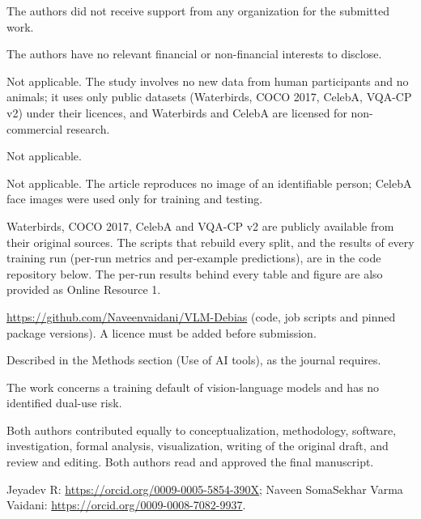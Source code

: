\documentclass[pdflatex,sn-basic,iicol]{sn-jnl}
\theoremstyle{thmstyleone}
\theoremstyle{thmstyletwo}
\theoremstyle{thmstylethree}
\begin{document}
The authors did not receive support from any organization for the submitted work.

The authors have no relevant financial or non-financial interests to disclose.

Not applicable. The study involves no new data from human participants and no animals; it uses only public datasets
(Waterbirds, COCO 2017, CelebA, VQA-CP v2) under their licences, and Waterbirds and CelebA are licensed for
non-commercial research.

Not applicable.

Not applicable. The article reproduces no image of an identifiable person; CelebA face images were used only for
training and testing.

Waterbirds, COCO 2017, CelebA and VQA-CP v2 are publicly available from their original sources. The scripts that
rebuild every split, and the results of every training run (per-run metrics and per-example predictions), are in the
code repository below. The per-run results behind every table and figure are also provided as Online Resource 1.

\url{https://github.com/Naveenvaidani/VLM-Debias} (code, job scripts and pinned package versions). A licence must be
added before submission.

Described in the Methods section (Use of AI tools), as the journal requires.

The work concerns a training default of vision-language models and has no identified dual-use risk.

Both authors contributed equally to conceptualization, methodology, software, investigation, formal analysis,
visualization, writing of the original draft, and review and editing. Both authors read and approved the final
manuscript.

Jeyadev R: \url{https://orcid.org/0009-0005-5854-390X}; Naveen SomaSekhar Varma Vaidani:
\url{https://orcid.org/0009-0008-7082-9937}.


\end{document}
